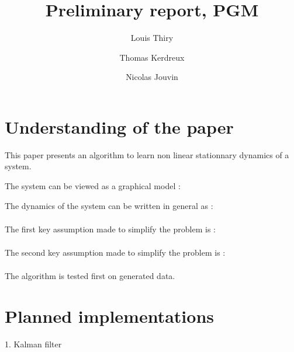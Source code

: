 \documentclass[11pt, oneside]{amsart}
\title[]{Preliminary report, PGM}
\author[1]{Louis Thiry}
\author[2]{Thomas Kerdreux}
\author[3]{Nicolas Jouvin}
\begin{document}
\maketitle

\section{Understanding of the paper}

This paper presents an algorithm to learn non linear stationnary dynamics of a system.

The system can be viewed as a graphical model :

The dynamics of the system can be written in general as :
\begin{align*}
\end{align*}

The first key assumption made to simplify the problem is :
\begin{align*}
\end{align*}

The second key assumption made to simplify the problem is :
\begin{align*}
\end{align*}

The algorithm is tested first on generated data.

\section{Planned implementations}

1. Kalman filter
\end{document}
